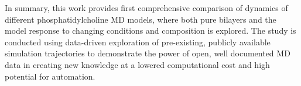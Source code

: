 \documentclass[journal=jpcbfk,manuscript=article,layout=twocolumn]{achemso}
\begin{document}

In summary, this work provides first comprehensive comparison of dynamics of different phosphatidylcholine MD models, where both pure bilayers and the model response to changing conditions and composition is explored. The study is conducted using data-driven exploration of pre-existing, publicly available simulation trajectories to demonstrate the power of open, well documented MD data in creating new knowledge at a lowered computational cost and high potential for automation.  
\end{document}
